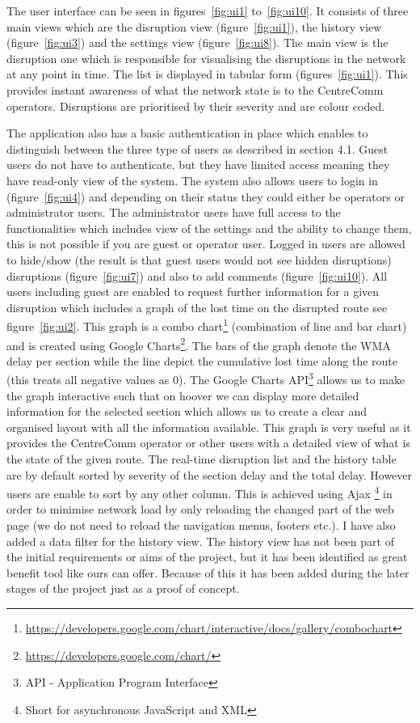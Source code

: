 The user interface can be seen in figures~\ref{fig:ui1} to~\ref{fig:ui10}. It consists of three main views which are the disruption view (figure~\ref{fig:ui1}), the history view (figure~\ref{fig:ui3}) and the settings view (figure~\ref{fig:ui8}). The main view is the disruption one which is responsible for visualising the disruptions in the network at any point in time. The list is displayed in tabular form (figures~\ref{fig:ui1}). This provides instant awareness of what the network state is to the CentreComm operators. Disruptions are prioritised by their severity and are colour coded.

The application also has a basic authentication in place which enables to distinguish between the three type of users as described in section 4.1. Guest users do not have to authenticate, but they have limited access meaning they have read-only view of the system. The system also allows users to login in (figure~\ref{fig:ui4}) and depending on their status they could either be operators or administrator users. The administrator users have full access to the functionalities which includes view of the settings and the ability to change them, this is not possible if you are guest or operator user. Logged in users are allowed to hide/show (the result is that guest users would not see hidden disruptions) disruptions (figure~\ref{fig:ui7}) and also to add comments (figure~\ref{fig:ui10}). All users including guest are enabled to request further information for a given disruption which includes a graph of the lost time on the disrupted route see figure~\ref{fig:ui2}. This graph is a combo chart\footnote{\url{https://developers.google.com/chart/interactive/docs/gallery/combochart}} (combination of line and bar chart) and is created using Google Charts\footnote{\url{https://developers.google.com/chart/}}. The bars of the graph denote the WMA delay per section while the line depict the cumulative lost time along the route (this treats all negative values as $0$). The Google Charts API\footnote{API - Application Program Interface} allows us to make the graph interactive such that on hoover we can display more detailed information for the selected section which allows us to create a clear and organised layout with all the information available. This graph is very useful as it provides the CentreComm operator or other users with a detailed view of what is the state of the given route. The real-time disruption list and the history table are by default sorted by severity of the section delay and the total delay. However users are enable to sort by any other column. This is achieved using Ajax \footnote{Short for asynchronous JavaScript and XML} in order to minimise network load by only reloading the changed part of the web page (we do not need to reload the navigation menus, footers etc.). I have also added a data filter for the history view. The history view has not been part of the initial requirements or aims of the project, but it has been identified as great benefit tool like ours can offer. Because of this it has been added during the later stages of the project just as a proof of concept.


